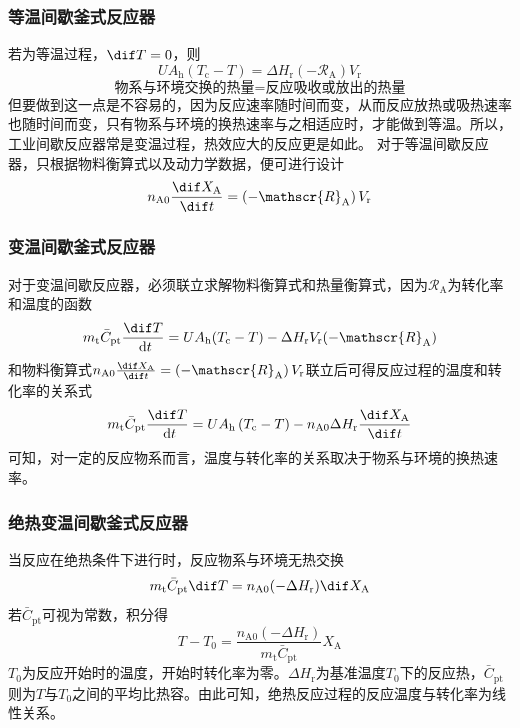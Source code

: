 \documentclass[dvipsnames, svgnames, x11names]{beamer}
\begin{document}
\begin{frame}
    \frametitle{等温间歇釜式反应器}

    若为等温过程，$\dif T=0$，则
    {\huge\[
        U A_{\mathrm{h}}(T_{\mathrm{c}}-T) = \Delta H_{\mathrm{r}}(-\mathscr{R}_{\mathrm{A}}) V_{\mathrm{r}}
    \]}
    \[
        \text{物系与环境交换的热量} = \text{反应吸收或放出的热量}
    \]
    但要做到这一点是不容易的，因为反应速率随时间而变，从而反应放热或吸热速率也随时间而变，只有物系与环境的换热速率与之相适应时，才能做到等温。所以，工业间歇反应器常是变温过程，热效应大的反应更是如此。
    对于等温间歇反应器，只根据物料衡算式以及动力学数据，便可进行设计
    \[
        n_{\mathrm{A} 0} \frac{\dif  X_{\mathrm{A}}}{\dif  t}=\left(-\mathscr{R}_{\mathrm{A}}\right) V_{\mathrm{r}}
    \]
\end{frame}


\begin{frame}
    \frametitle{变温间歇釜式反应器}
    对于变温间歇反应器，必须联立求解物料衡算式和热量衡算式，因为$\mathcal{R}_\mathrm{A}$为转化率和温度的函数
    \[
        m_{\mathrm{t}} \bar{C}_{\mathrm{pt}} \frac{\dif  T}{\mathrm{~d} t}=U A_{\mathrm{h}}(T_{\mathrm{c}}-T)-\Delta H_{\mathrm{r}} V_{\mathrm{r}}(-\mathscr{R}_{\mathrm{A}})
    \]
    和物料衡算式$n_{\mathrm{A} 0} \frac{\dif  X_{\mathrm{A}}}{\dif  t}=\left(-\mathscr{R}_{\mathrm{A}}\right) V_{\mathrm{r}}$联立后可得反应过程的温度和转化率的关系式
    {\huge\[
        m_{\mathrm{t}} \bar{C}_{\mathrm{pt}} \frac{\dif  T}{\mathrm{~d} t}=U A_{\mathrm{h}}\left(T_{\mathrm{c}}-T\right)-n_{\mathrm{A} 0} \Delta H_{\mathrm{r}} \frac{\dif  X_{\mathrm{A}}}{\dif  t}
    \]}
    可知，对一定的反应物系而言，温度与转化率的关系取决于物系与环境的换热速率。

\end{frame}


\begin{frame}
    \frametitle{绝热变温间歇釜式反应器}

    当反应在绝热条件下进行时，反应物系与环境无热交换
    {\huge\[
        m_{\mathrm{t}} \bar{C}_{\mathrm{pt}} \dif  T=n_{\mathrm{A} 0}(-\Delta H_{\mathrm{r}}) \dif  X_{\mathrm{A}}
    \]}
    若$\bar{C}_{\mathrm{pt}}$可视为常数，积分得
    {\huge\[
        T-T_{0}=\frac{n_{\mathrm{A} 0}(-\Delta H_{\mathrm{r}})}{m_{\mathrm{t}} \bar{C}_{\mathrm{pt}}} X_{\mathrm{A}}
    \]}
    $T_0$为反应开始时的温度，开始时转化率为零。$\Delta H_{\mathrm{r}}$为基准温度$T_0$下的反应热，$\bar{C}_{\mathrm{pt}}$则为$T$与$T_0$之间的平均比热容。由此可知，绝热反应过程的反应温度与转化率为线性关系。

\end{frame}
\end{document}
